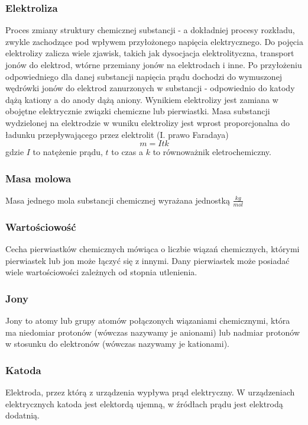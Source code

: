 \documentclass[a4paper,12pts]{article}
\begin{document}
			\subsubsection{Elektroliza}
			Proces zmiany struktury chemicznej substancji - a dokładniej procesy rozkładu, zwykle zachodzące pod wpływem przyłożonego napięcia elektrycznego. Do pojęcia elektrolizy zalicza wiele zjawisk, takich jak dysocjacja elektrolityczna, transport jonów do elektrod, wtórne przemiany jonów na elektrodach i inne. Po przyłożeniu odpowiedniego dla danej substancji napięcia prądu dochodzi do wymuszonej wędrówki jonów do elektrod zanurzonych w  substancji - odpowiednio do katody dążą kationy a do anody dążą aniony. Wynikiem elektrolizy jest zamiana w obojętne elektrycznie związki chemiczne lub pierwiastki. Masa substancji wydzielonej na elektrodzie w wuniku elektrolizy jest wprost proporcjonalna do ładunku przepływającego przez elektrolit (I. prawo Faradaya)
			\begin{equation}
				m = Itk
			\end{equation}
			gdzie $I$ to natężenie prądu, $t$ to czas a $k$ to równoważnik eletrochemiczny.
			
			\subsubsection{Masa molowa}
			Masa jednego mola substancji chemicznej wyrażana jednostką $\frac{kg}{mol}$
			
			\subsubsection{Wartościowość}
			Cecha pierwiastków chemicznych mówiąca o liczbie wiązań chemicznych, którymi pierwiastek lub jon może łączyć się z innymi. Dany pierwiastek może posiadać wiele wartościowości zależnych od stopnia utlenienia.
			
			\subsubsection{Jony}
			Jony to atomy lub grupy atomów połączonych wiązaniami chemicznymi, która ma niedomiar protonów (wówczas nazywamy je anionami) lub nadmiar protonów w stosunku do elektronów (wówczas nazywamy je kationami).
			
			\subsubsection{Katoda}
			Elektroda, przez którą z urządzenia wypływa prąd elektryczny. W urządzeniach elektrycznych katoda jest elektordą ujemną, w źródłach prądu jest elektrodą dodatnią.
			
\end{document}
